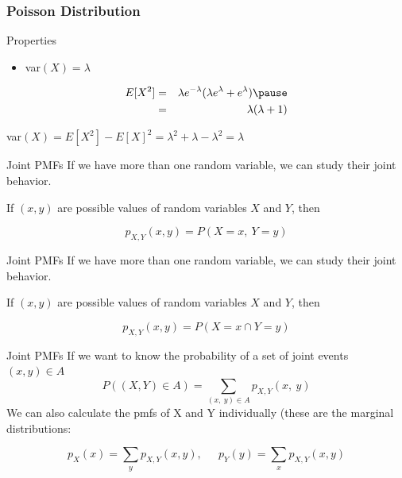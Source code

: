 \documentclass{beamer}
\numberwithin{equation}{section}
\begin{document}
\begin{frame}

\frametitle{Poisson Distribution}
Properties
\begin{itemize}
\item[3)] var$(X) = \lambda$
\end{itemize}

\begin{eqnarray}
E[X^2] & = & \lambda e^{-\lambda} (\lambda e^{\lambda} + e^{\lambda} ) \nonumber \pause \\
& = & \lambda (\lambda  + 1 ) \nonumber 
\end{eqnarray}


var$(X) = E[X^2] - E[X]^2 = \lambda^2 + \lambda  - \lambda^2  = \lambda$





\end{frame}



\begin{frame}{Joint PMFs}
If we have more than one random variable, we can study their joint behavior.

If $(x,y)$ are possible values of random variables $X$ and $Y$, then 

$$p_{X,Y}(x, y)=P(X=x,\ Y=y)$$

\end{frame}

\begin{frame}{Joint PMFs}
If we have more than one random variable, we can study their joint behavior.

If $(x,y)$ are possible values of random variables $X$ and $Y$, then 

$$p_{X,Y}(x, y)=P(X=x \cap Y=y)$$

\end{frame}

\begin{frame}{Joint PMFs}
If we want to know the probability of a set of joint events $(x, y) \in A$
$$P((X,Y)\in A)=\sum_{(x,\ y)\in A} p_{X,Y} (x,\ y)$$
We can also calculate the pmfs of X and Y individually (these are the marginal distributions:

$$p_X(x)=\sum_y p_{X,Y}(x, y), \ \ \quad p_Y(y)=\sum_x p_{X,Y}(x, y)$$

\end{frame}
\end{document}
